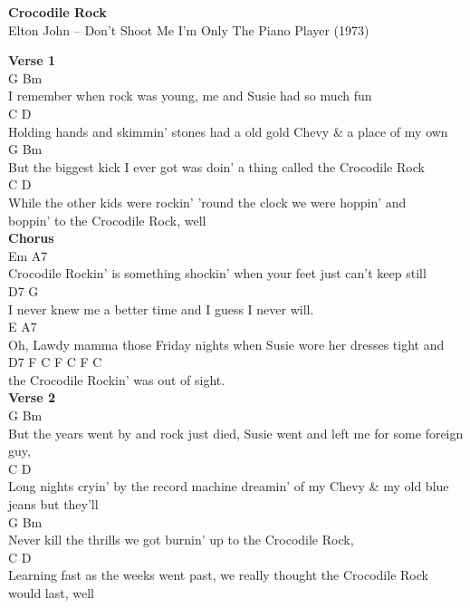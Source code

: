 \documentclass[a4paper]{article}
\begin{document}
    \begin{center}
        \textbf{Crocodile Rock}
        ~\\
        Elton John -- Don't Shoot Me I'm Only The Piano Player (1973)
    \end{center}
    {
        \scriptsize
        \textbf{Verse 1}
        ~\\
        {
            \cutive
            \obeyspaces
     G                                    Bm
\\
I remember when rock was young,    me and Susie had so much fun
\\
        C                                D
\\
Holding hands and skimmin' stones  had a old gold Chevy \& a place of my own
\\
        G                                      Bm
\\
But the biggest kick I ever got    was doin' a thing called the Crocodile Rock
\\
          C                                                D
\\
While the other kids were rockin' 'round the clock we were hoppin' and
\\
boppin' to the Crocodile Rock, well
\\

        }
        \textbf{Chorus}
        ~\\
        {
            \cutive
            \obeyspaces
Em                                                A7
\\
Crocodile Rockin' is something shockin' when your feet just can't keep still
\\
D7                                 G
\\
I never knew me a better time and I guess I never will.
\\
E                                        A7
\\
Oh, Lawdy mamma those Friday nights when Susie wore her dresses tight and
\\
D7                               F C F C F C
\\
the Crocodile Rockin' was out of sight.
\\

        }
        \textbf{Verse 2}
        ~\\
        {
            \cutive
            \obeyspaces
        G                                 Bm
\\
But the years went by and rock just died, Susie went and left me for some foreign guy,
\\
C                                        D
\\
Long nights cryin' by the record machine dreamin' of my Chevy \& my old blue jeans but they'll
\\
G                                        Bm
\\
Never kill the thrills we got    burnin' up to the Crocodile Rock,
\\
         C                                        D
\\
Learning fast as the weeks went past, we really thought the Crocodile Rock would last, well
\\

}}
\end{document}
